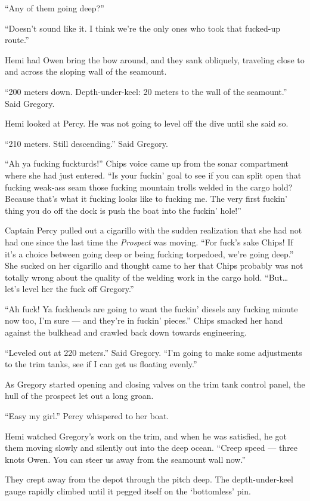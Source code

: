 \documentclass[]{scrbook}
\begin{document}
``Any of them going deep?''

``Doesn't sound like it. I think we're the only ones who took that
fucked-up route.''

Hemi had Owen bring the bow around, and they sank obliquely, traveling
close to and across the sloping wall of the seamount.

``200 meters down. Depth-under-keel: 20 meters to the wall of the
seamount.'' Said Gregory.

Hemi looked at Percy. He was not going to level off the dive until she
said so.

``210 meters. Still descending.'' Said Gregory.

``Ah ya fucking fuckturds!'' Chips voice came up from the sonar
compartment where she had just entered. ``Is your fuckin' goal to see if
you can split open that fucking weak-ass seam those fucking mountain
trolls welded in the cargo hold? Because that's what it fucking looks
like to fucking me. The very first fuckin' thing you do off the dock is
push the boat into the fuckin' hole!''

Captain Percy pulled out a cigarillo with the sudden realization that
she had not had one since the last time the \emph{Prospect} was moving.
``For fuck's sake Chips! If it's a choice between going deep or being
fucking torpedoed, we're going deep.'' She sucked on her cigarillo and
thought came to her that Chips probably was not totally wrong about the
quality of the welding work in the cargo hold. ``But\ldots{} let's level
her the fuck off Gregory.''

``Ah fuck! Ya fuckheads are going to want the fuckin' diesels any
fucking minute now too, I'm sure --- and they're in fuckin' pieces.''
Chips smacked her hand against the bulkhead and crawled back down
towards engineering.

``Leveled out at 220 meters.'' Said Gregory. ``I'm going to make some
adjustments to the trim tanks, see if I can get us floating evenly.''

As Gregory started opening and closing valves on the trim tank control
panel, the hull of the prospect let out a long groan.

``Easy my girl.'' Percy whispered to her boat.

Hemi watched Gregory's work on the trim, and when he was satisfied, he
got them moving slowly and silently out into the deep ocean. ``Creep
speed --- three knots Owen. You can steer us away from the seamount wall
now.''

They crept away from the depot through the pitch deep. The
depth-under-keel gauge rapidly climbed until it pegged itself on the
`bottomless' pin.
\end{document}
